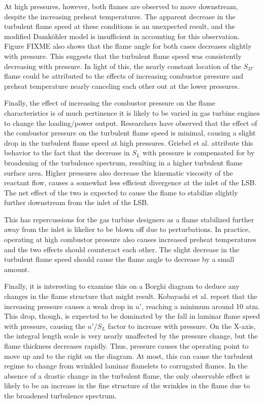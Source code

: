 At high pressures, however, both flames are observed to move downstream, despite the increasing preheat temperatures.
The apparent decrease in the turbulent flame speed at these conditions is an unexpected result, and the modified Damk\"ohler model is insufficient in accounting for this observation.
Figure FIXME also shows that the flame angle for both cases decreases slightly with pressure.
This suggests that the turbulent flame speed was consistently decreasing with pressure.
In light of this, the nearly constant location of the \(S_{37^\circ}\) flame could be attributed to the effects of increasing combustor pressure and preheat temperature nearly canceling each other out at the lower pressures.

Finally, the effect of increasing the combustor pressure on the flame characteristics is of much pertinence it is likely to be varied in gas turbine engines to change the loading/power output.
Researchers\cite{1998-kobayashi,2002-kobayashi-b} have observed that the effect of the combustor pressure on the turbulent flame speed is minimal, causing a slight drop in the turbulent flame speed at high pressures.
Griebel et al.\cite{2007-griebel} attribute this behavior to the fact that the decrease in \(S_L\) with pressure is compensated for by broadening of the turbulence spectrum, resulting in a higher turbulent flame surface area.
Higher pressures also decrease the kinematic viscosity of the reactant flow, causes a somewhat less efficient divergence at the inlet of the LSB.
The net effect of the two is expected to cause the flame to stabilize slightly further downstream from the inlet of the LSB.

This has repercussions for the gas turbine designers as a flame stabilized further away from the inlet is likelier to be blown off due to perturbations.
In practice, operating at high combustor pressure also causes increased preheat temperatures and the two effects should counteract each other.
The slight decrease in the turbulent flame speed should cause the flame angle to decrease by a small amount.

Finally, it is interesting to examine this on a Borghi diagram to deduce any changes in the flame structure that might result.
Kobayashi et al.\cite{1997-kobayashi} report that the increasing pressure causes a weak drop in \(u'\), reaching a minimum around 10 atm.
This drop, though, is expected to be dominated by the fall in laminar flame speed with pressure, causing the \(u'/S_L\) factor to increase with pressure.
On the X-axis, the integral length scale is very nearly unaffected by the pressure change, but the flame thickness decreases rapidly.
Thus, pressure causes the operating point to move up and to the right on the diagram.
At most, this can cause the turbulent regime to change from wrinkled laminar flamelets to corrugated flames.
In the absence of a drastic change in the turbulent flame, the only observable effect is likely to be an increase in the fine structure of the wrinkles in the flame due to the broadened turbulence spectrum.


